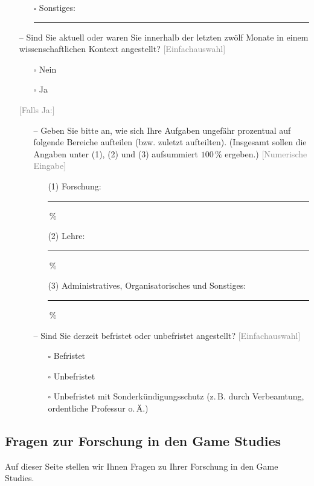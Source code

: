 \documentclass{scrartcl}
\begin{document}
\begin{itemize}
\begin{itemize}
      \item[$\square$] Sonstiges:\ \rule{2cm}{0.4pt}
   \end{itemize}
   \item[--] Sind Sie aktuell oder waren Sie innerhalb der letzten zwölf Monate in einem wissenschaftlichen Kontext angestellt? \textcolor{gray}{\textsf{[Einfachauswahl]}}
   \begin{itemize}
      \item[$\square$] Nein
      \item[$\square$] Ja
   \end{itemize}
   \item[] \textcolor{gray}{\textsf{[Falls Ja:]}}
   \begin{itemize}
      \item[--] Geben Sie bitte an, wie sich Ihre Aufgaben ungefähr prozentual auf folgende Bereiche aufteilen (bzw. zuletzt aufteilten). (Insgesamt sollen die Angaben unter (1), (2) und (3) aufsummiert $100\,\%$ ergeben.) \textcolor{gray}{\textsf{[Numerische Eingabe]}}
      \begin{itemize}
         \item[(1)] Forschung:\ \rule{2cm}{0.4pt}\,$\%$
         \item[(2)] Lehre:\ \rule{2cm}{0.4pt}\,$\%$
         \item[(3)] Administratives, Organisatorisches und Sonstiges:\ \rule{2cm}{0.4pt}\,$\%$
      \end{itemize}
      \item[--] Sind Sie derzeit befristet oder unbefristet angestellt? \textcolor{gray}{\textsf{[Einfachauswahl]}}
      \begin{itemize}
         \item[$\square$] Befristet
         \item[$\square$] Unbefristet
         \item[$\square$] Unbefristet mit Sonderkündigungsschutz (z.\,B. durch Verbeamtung, ordentliche Professur o.\,Ä.)
      \end{itemize}
   \end{itemize}
\end{itemize}


\subsection*{Fragen zur Forschung in den Game Studies}
Auf dieser Seite stellen wir Ihnen Fragen zu Ihrer Forschung in den Game Studies.
\end{document}
